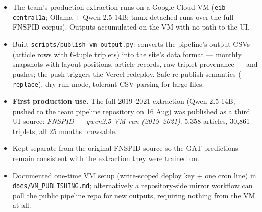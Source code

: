 \documentclass[11pt]{article}
\begin{document}
\begin{itemize}
  \item The team's production extraction runs on a Google Cloud VM (\texttt{eib-central1a}; Ollama + Qwen 2.5 14B; tmux-detached runs over the full FNSPID corpus). Outputs accumulated on the VM with no path to the UI.
  \item Built \texttt{scripts/publish\_vm\_output.py}: converts the pipeline's output CSVs (article rows with 6-tuple triplets) into the site's data format --- monthly snapshots with layout positions, article records, raw triplet provenance --- and pushes; the push triggers the Vercel redeploy. Safe re-publish semantics (\texttt{--replace}), dry-run mode, tolerant CSV parsing for large files.
  \item \textbf{First production use.} The full 2019--2021 extraction (Qwen 2.5 14B, pushed to the team pipeline repository on 16 Aug) was published as a third UI source: \emph{FNSPID --- qwen2.5 VM run (2019--2021)}. 5{,}358 articles, 30{,}861 triplets, all 25 months browsable.
  \item Kept separate from the original FNSPID source so the GAT predictions remain consistent with the extraction they were trained on.
  \item Documented one-time VM setup (write-scoped deploy key + one cron line) in \texttt{docs/VM\_PUBLISHING.md}; alternatively a repository-side mirror workflow can poll the public pipeline repo for new outputs, requiring nothing from the VM at all.
\end{itemize}
\end{document}
